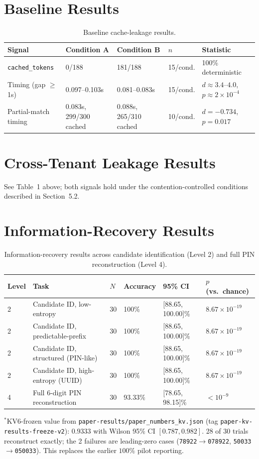 \documentclass[11pt]{article}
\begin{document}
\section{Baseline Results}
\label{sec:baseline}
\begin{table}[h]
\centering
\caption{Baseline cache-leakage results.}
\begin{tabular}{@{}lllll@{}}
\toprule
Signal & Condition A & Condition B & $n$ & Statistic \\
\midrule
\texttt{cached\_tokens} & 0/188 & 181/188 & 15/cond. & 100\% deterministic \\
Timing (gap $\geq$1s) & 0.097--0.103s & 0.081--0.083s & 15/cond. & $d\approx3.4$--$4.0$, $p\approx2\times10^{-4}$ \\
Partial-match timing & 0.083s, 299/300 cached & 0.088s, 265/310 cached & 10/cond. & $d=-0.734$, $p=0.017$ \\
\bottomrule
\end{tabular}
\end{table}

\section{Cross-Tenant Leakage Results}
See Table~1 above; both signals hold under the contention-controlled
conditions described in Section~5.2.

\section{Information-Recovery Results}
\begin{table}[h]
\centering
\caption{Information-recovery results across candidate identification (Level 2) and full PIN reconstruction (Level 4).}
\begin{tabular}{@{}llllll@{}}
\toprule
Level & Task & $N$ & Accuracy & 95\% CI & $p$ (vs.\ chance) \\
\midrule
2 & Candidate ID, low-entropy & 30 & 100\% & [88.65, 100.00]\% & $8.67\times10^{-19}$ \\
2 & Candidate ID, predictable-prefix & 30 & 100\% & [88.65, 100.00]\% & $8.67\times10^{-19}$ \\
2 & Candidate ID, structured (PIN-like) & 30 & 100\% & [88.65, 100.00]\% & $8.67\times10^{-19}$ \\
2 & Candidate ID, high-entropy (UUID) & 30 & 100\% & [88.65, 100.00]\% & $8.67\times10^{-19}$ \\
4 & Full 6-digit PIN reconstruction & 30 & 93.33\% & [78.65, 98.15]\% & $<10^{-9}$ \\
\bottomrule
\end{tabular}
\end{table}
\noindent $^{*}$KV6-frozen value from
\texttt{paper-results/paper\_numbers\_kv.json} (tag
\texttt{paper-kv-results-freeze-v2}): $0.9333$ with Wilson 95\% CI
$[0.787, 0.982]$. 28 of 30 trials reconstruct exactly; the 2 failures
are leading-zero cases (\texttt{78922}$\to$\texttt{078922},
\texttt{50033}$\to$\texttt{050033}). This replaces the earlier
\mbox{$100\%$} pilot reporting.
\end{document}
